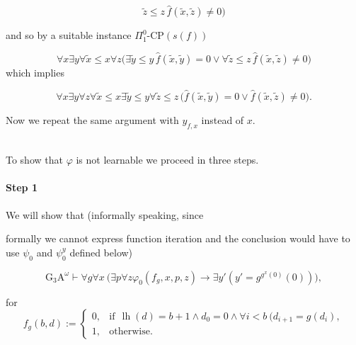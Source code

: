 \documentclass[1p]{elsarticle}
\DeclareMathOperator{\lh}{lh}  %
\newcommand{\Tif}{\text{if}\ }
\newcommand{\Telse}{\text{otherwise}}
\theoremstyle{plain}
\theoremstyle{definition}
\theoremstyle{remark}
\renewenvironment{proof}[1][]{\noindent{\bf Proof{#1}. }}{\nopagebreak[4]{\hspace*{\fill}


  $\Box$              %

 }{\vspace{2ex}}}
\renewcommand{\phi}{\varphi}
\theoremstyle{definition}
\begin{document}
{\begin{proof}
\[\tilde{z}\le z 

\,\widehat{f}(\tilde{x},\tilde{z})\not=0\big) \] 

and so by a suitable instance $\Pi^0_1$-CP$(s(f))$ 

\[ \forall x\exists y \forall \tilde{x}\le x \forall z 

\big( 

\exists \tilde{y}\le y\,\widehat{f}(\tilde{x},\tilde{y})=0 \vee \forall 

\tilde{z}\le z 

\,\widehat{f}(\tilde{x},\tilde{z})\not=0\big) \] which implies  

\[ \forall x\exists y \forall z\forall \tilde{x}\le x \exists \tilde{y}\le y

\forall \tilde{z}\le z\, 

\big( \widehat{f}(\tilde{x},\tilde{y})=0 \vee 

\widehat{f}(\tilde{x},\tilde{z})\not=0\big). \]



Now we repeat the same argument with $y_{f,x}$ instead of $x.$

\\[1mm] 

To show that $\varphi$ is not learnable we proceed in three steps.

\paragraph{Step 1} We will show that (informally speaking, since 

formally we cannot express function iteration and the conclusion would have to use $\psi_0$ and $\psi^y_0$ defined below)

\[

\mbox{G$_3$A}^\omega\vdash \forall g \forall x\ \big(\exists p\forall z\phi_0(f_g,x,p,z)\rightarrow \exists y'(y'=g^{g^{x}(0)}(0))\big),

\tag{GA}\label{e:GA}

\]

for \[

f_g(b,d):=\begin{cases}

0,&\Tif \ \lh(d) = b+1 \wedge d_0=0\wedge \forall i< b\ (d_{i+1}=g(d_i),\\

1,&\Telse.

\end{cases}

\]


\end{proof}}
\end{document}
